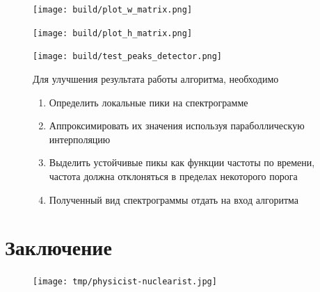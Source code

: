 \documentclass[unicode]{beamer}
\begin{document}
\begin{frame}
\begin{figure}
    \texttt{[image: build/plot\_w\_matrix.png]}
\end{figure}
\end{frame}

\begin{frame}
\begin{figure}
    \texttt{[image: build/plot\_h\_matrix.png]}
\end{figure}
\end{frame}

\begin{frame}
\begin{figure}
    \texttt{[image: build/test\_peaks\_detector.png]}
\end{figure}
\end{frame}

\begin{frame}
\begin{figure}
Для улучшения результата работы алгоритма, необходимо
\begin{enumerate}
  \item Определить локальные пики на спектрограмме
  \item Аппроксимировать их значения используя параболлическую интерполяцию
  \item Выделить устойчивые пикы как функции частоты по времени,
    частота должна отклоняться в пределах некоторого порога
  \item Полученный вид спектрограммы отдать на вход алгоритма
\end{enumerate}
\end{figure}
\end{frame}

\section{Заключение}

\begin{frame}
\end{frame}

\begin{frame}
\begin{figure}
    \texttt{[image: tmp/physicist-nuclearist.jpg]}
\end{figure}
\end{frame}
\end{document}
